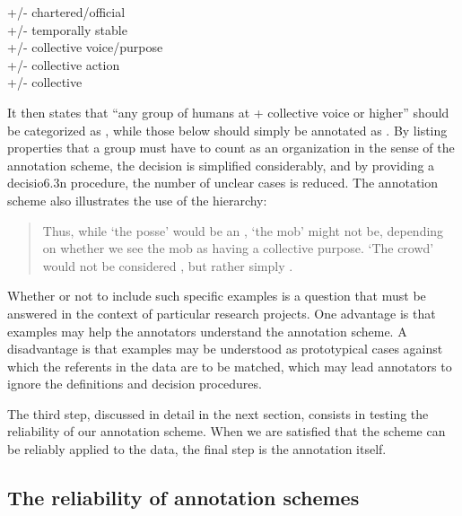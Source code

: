 \begin{exe}
\ex +/- chartered/official\\
+/- temporally stable\\
+/- collective voice/purpose\\
+/- collective action\\
+/- collective
\label{ex:animacyorg}
\end{exe}

It then states that ``any group of humans at + collective voice or higher'' should be categorized as , while those below should simply be annotated as . By listing properties that a group must have to count as an organization in the sense of the annotation scheme, the decision is simplified considerably, and by providing a decisio6.3n procedure, the number of unclear cases is reduced. The annotation scheme also illustrates the use of the hierarchy:

\begin{quote}
Thus, while `the posse' would be an , `the mob' might not be, depending on whether we see the mob as having a collective purpose. `The crowd' would not be considered , but rather simply .
\end{quote}

Whether or not to include such specific examples is a question that must be answered in the context of particular research projects. One advantage is that examples may help the annotators understand the annotation scheme. A disadvantage is that examples may be understood as prototypical cases against which the referents in the data are to be matched, which may lead annotators to ignore the definitions and decision procedures.

The third step, discussed in detail in the next section, consists in testing the reliability of our annotation scheme. When we are satisfied that the scheme can be reliably applied to the data, the final step is the annotation itself.

\subsection{The reliability of annotation schemes}
\label{sec:reliabilityannotationschemes}

